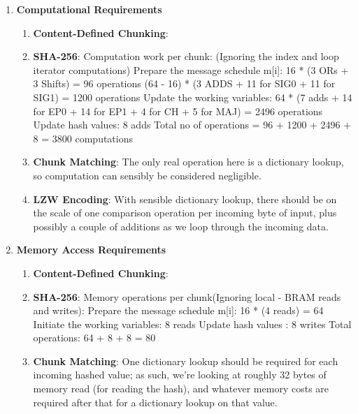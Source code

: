 \documentclass{article}
\begin{document}
\begin{enumerate}
\begin{enumerate}[label=(\alph*)]
\item%
\textbf{Computational Requirements}
\begin{enumerate}[label=(\roman*)]
\item%
\textbf{Content-Defined Chunking}:\newline

\item%
\textbf{SHA-256}:\newline
Computation work per chunk: (Ignoring the index and loop iterator computations)
Prepare the message schedule m[i]: 16 * (3 ORs + 3 Shifts) = 96 operations
 						      (64 - 16) * (3 ADDS + 11 for SIG0 + 11 for SIG1) = 1200 operations
Update the working variables: 64 * (7 adds + 14 for EP0 + 14 for EP1 + 4 for CH + 5 for MAJ) = 2496 operations
Update hash values: 8 adds
Total no of operations = 96 + 1200 + 2496 + 8 = 3800 computations

\item%
\textbf{Chunk Matching}:\newline
The only real operation here is a dictionary lookup, so computation can sensibly be considered negligible.

\item%
\textbf{LZW Encoding}:\newline
With sensible dictionary lookup, there should be on the scale of one comparison operation per incoming byte of input, plus possibly a couple of additions as we loop through the incoming data.


\end{enumerate}%

\item%
\textbf{Memory Access Requirements}
\begin{enumerate}[label=(\roman*)]
\item%
\textbf{Content-Defined Chunking}:\newline

\item%
\textbf{SHA-256}:\newline
Memory operations per chunk(Ignoring local - BRAM reads and writes): 
Prepare the message schedule m[i]: 16 * (4 reads) = 64 
Initiate the working variables: 8 reads  
Update hash values : 8 writes
Total operations: 64 + 8 + 8 = 80 

\item%
\textbf{Chunk Matching}:\newline
One dictionary lookup should be required for each incoming hashed value; as such, we're looking at roughly 32 bytes of memory read (for reading the hash), and whatever memory costs are required after that for a dictionary lookup on that value.


\end{enumerate}
\end{enumerate}
\end{enumerate}
\end{document}

